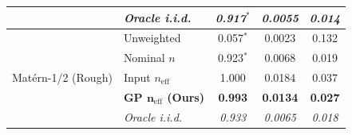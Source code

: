\begin{table}[!htbp]
{\begin{tabular}{@{}llccc@{}}
& \textit{Oracle i.i.d.}   & \textit{0.917}$^*$ & \textit{0.0055} & \textit{0.014} \\
\midrule
\multirow{5}{*}{Mat\'ern-1/2 (Rough)} 
& Unweighted               & 0.057$^*$ & 0.0023 & 0.132 \\
& Nominal $n$              & 0.923$^*$ & 0.0068 & 0.019 \\
& Input $n_{\mathrm{eff}}$ & 1.000\phantom{$^*$} & 0.0184 & 0.037 \\
& \textbf{GP $\bm{n_{\mathrm{eff}}}$ (Ours)} & \textbf{0.993}\phantom{$^*$} & \textbf{0.0134} & \textbf{0.027} \\
& \textit{Oracle i.i.d.}   & \textit{0.933}\phantom{$^*$} & \textit{0.0065} & \textit{0.018} \\
\bottomrule
\end{tabular}}
\end{table}